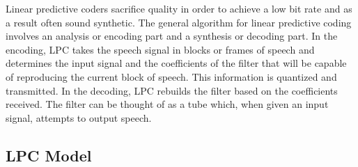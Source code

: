 \documentclass[12pt, a4paper, twoside]{report}
\begin{document}
Linear predictive coders sacrifice quality in order to achieve a low bit rate and as a result often sound synthetic. The general algorithm for linear predictive coding involves an analysis or encoding part and a synthesis or decoding part. In the encoding, LPC takes the speech signal in blocks or frames of speech and determines the input signal and the coefficients of the filter that will be capable of reproducing the current block of speech. This information is quantized and transmitted. In the decoding, LPC rebuilds the filter based on the coefficients received. The filter can be thought of as a tube which, when given an input signal, attempts to output speech.

\subsection{LPC Model}
\end{document}
